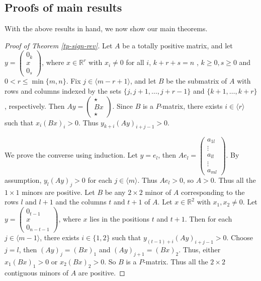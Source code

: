 \documentclass[11pt]{article}
\begin{document}
\subsection{Proofs of main results}\label{sec-tp}

With the above results in hand, we now show our main theorems.

\begin{proof}[Proof of Theorem \ref{tp-sign-rev}]
    Let $A$ be a totally positive matrix, and let $y=\begin{pmatrix} 0_k\\x\\0_s \end{pmatrix}$, where  $x \in \mathbb{R}^r$ with $x_i\neq 0$ for all $i$, $k + r + s = n$ , $k \geq 0, s \geq  0$ and $0<r \leq \min\{m, n\}$.
    Fix $j \in \langle m-r+1 \rangle$, and let 
    $B$ be the submatrix of $A$ with rows and columns indexed by the sets $\{j, j+1, \dots, j + r -1\}$ and $\{k+1,\dots,k+r\}$, respectively.
    Then $Ay = \begin{pmatrix} \star\\Bx\\ \star \end{pmatrix}.$
    Since $B$ is a $P$-matrix, there exists $i \in \langle r \rangle$ such that $x_i(Bx)_i > 0$. Thus $y_{k+i}(Ay)_{i+j-1} > 0.$

    We prove the converse using induction. Let $y=e_l$, then $Ae_l = \begin{pmatrix} a_{1l}\\\vdots\\a_{ll}\\\vdots\\a_{ml}\end{pmatrix}$. By assumption, $y_l(Ay)_j > 0$
    for each $j \in \langle m \rangle$.
    Thus $Ae_l>0$, so $A > 0.$ Thus all the $1 \times 1$ minors are positive.
    Let $B$ be any $2 \times 2$ minor of $A$ corresponding to the rows $l$ and $l+1$ and the columns $t$ and $t+1$ of $A$.
    Let $x \in \mathbb{R}^2$ with $x_1, x_2 \neq 0$. Let $y = \begin{pmatrix}0_{t-1}\\x\\0_{n-t-1} \end{pmatrix}$, where $x$ lies in the positions $t$ and $t+1$.
    Then for each $j \in \langle m-1\rangle$, there exists $i \in \{1,2\}$ such that $y_{(t-1)+i}(Ay)_{i+j-1} > 0$. Choose $j=l$, then $(Ay)_j=(Bx)_1$ and $(Ay)_{j+1}=(Bx)_2$. Thus, either $x_1(Bx)_1 > 0$ or $x_2(Bx)_2> 0$.
    So $B$ is a $P$-matrix. Thus all the $2 \times 2$ contiguous minors of $A$ are positive.


\end{proof}
\end{document}
